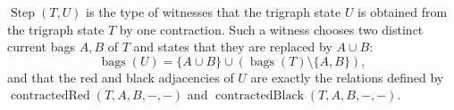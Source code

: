 \(\operatorname{Step}(T,U)\) is the type of witnesses that the trigraph state
\(U\) is obtained from the trigraph state \(T\) by one contraction.  Such a
witness chooses two distinct current bags \(A,B\) of \(T\) and states that they
are replaced by \(A\cup B\):
\[
  \operatorname{bags}(U)=\{A\cup B\}\cup
    (\operatorname{bags}(T)\setminus\{A,B\}),
\]
and that the red and black adjacencies of \(U\) are exactly the relations
defined by \(\operatorname{contractedRed}(T,A,B,-,-)\) and
\(\operatorname{contractedBlack}(T,A,B,-,-)\).
